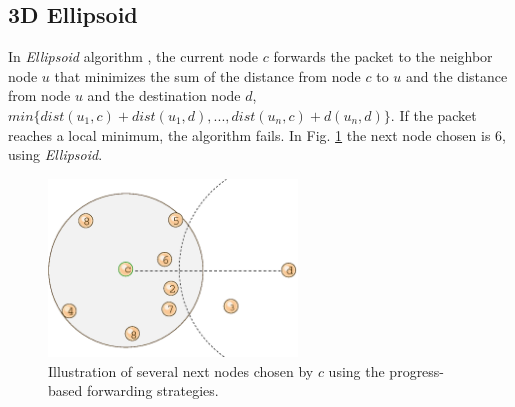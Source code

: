 \documentclass[journal,comsoc]{IEEEtran}
\begin{document}
\subsection{3D Ellipsoid}
In \emph{Ellipsoid} algorithm \cite{yama:compass}, the current node \(c\) forwards the packet to the neighbor node \(u\) that minimizes the sum of the distance from node \(c\) to \(u\) and the distance from node \(u\) and the destination node \(d\), \(min\{dist(u_1, c) + dist(u_1, d), ..., dist(u_n, c) + d(u_n, d)\}\). If the packet reaches a local minimum, the algorithm fails. In Fig. \ref{fig:progress} the next node chosen is \(6\), using \emph{Ellipsoid}.

\begin{figure}[!t]
\centering
    \includegraphics[width=2.6in]{progress}
  \caption{Illustration of several next nodes chosen by \(c\) using the progress-based forwarding strategies.}
  \label{fig:progress}
\end{figure}
\end{document}
